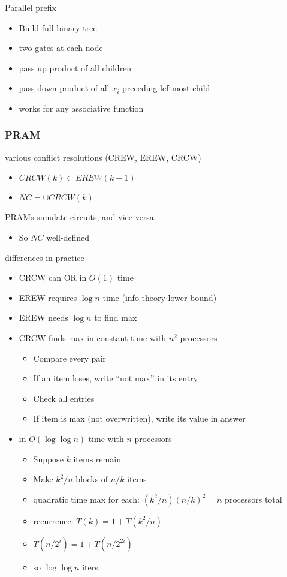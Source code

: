 \documentclass[12pt]{article}
\begin{document}
Parallel prefix
\begin{itemize}
\item Build full binary tree
\item two gates at each node
\item pass up product of all children
\item pass down product of all $x_i$ preceding leftmost child
\item works for any associative function
\end{itemize}


\subsubsection*{PRAM}

various conflict resolutions (CREW, EREW, CRCW)
\begin{itemize}
\item $CRCW(k) \subset EREW(k+1)$
\item $NC = \cup CRCW(k)$
\end{itemize}

PRAMs simulate circuits, and vice versa
\begin{itemize}
\item So $NC$ well-defined
\end{itemize}

differences in practice
\begin{itemize}
\item CRCW can OR in $O(1)$ time
\item EREW requires $\log n$ time (info theory lower bound)
\item EREW needs $\log n$ to find max
\item CRCW finds max in constant time with $n^2$ processors
\begin{itemize}
\item Compare every pair
\item If an item loses, write ``not max'' in its entry
\item Check all entries
\item If item is max (not overwritten), write its value in answer
\end{itemize}
\item in $O(\log\log n)$ time with $n$ processors
\begin{itemize}
\item Suppose $k$ items remain
\item Make $k^2/n$ blocks of $n/k$ items 
\item quadratic time max for each: $(k^2/n)(n/k)^2=n$ processors total
\item recurrence: $T(k)=1+T(k^2/n)$
\item $T(n/2^i)=1+T(n/2^{2i})$
\item so $\log\log n$ iters.
\end{itemize}
\end{itemize}
\end{document}
